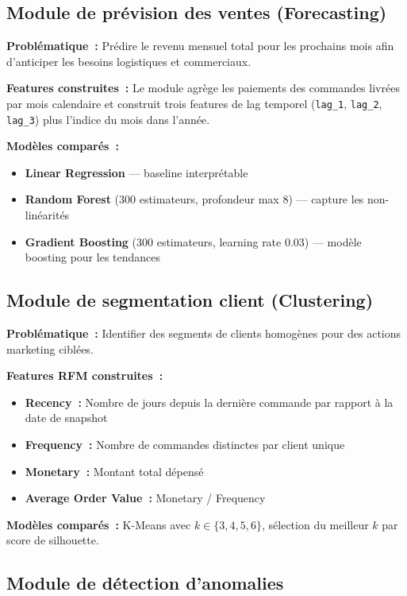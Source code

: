 \subsection{Module de prévision des ventes (Forecasting)}

\textbf{Problématique~:} Prédire le revenu mensuel total pour les prochains mois afin d'anticiper les besoins logistiques et commerciaux.

\textbf{Features construites~:} Le module agrège les paiements des commandes livrées par mois calendaire et construit trois features de lag temporel (\texttt{lag\_1}, \texttt{lag\_2}, \texttt{lag\_3}) plus l'indice du mois dans l'année.

\textbf{Modèles comparés~:}
\begin{itemize}
  \setlength{\itemsep}{0.3em}
  \item \textbf{Linear Regression} — baseline interprétable
  \item \textbf{Random Forest} (300 estimateurs, profondeur max 8) — capture les non-linéarités
  \item \textbf{Gradient Boosting} (300 estimateurs, learning rate 0.03) — modèle boosting pour les tendances
\end{itemize}

\subsection{Module de segmentation client (Clustering)}

\textbf{Problématique~:} Identifier des segments de clients homogènes pour des actions marketing ciblées.

\textbf{Features RFM construites~:}
\begin{itemize}
  \setlength{\itemsep}{0.3em}
  \item \textbf{Recency~:} Nombre de jours depuis la dernière commande par rapport à la date de snapshot
  \item \textbf{Frequency~:} Nombre de commandes distinctes par client unique
  \item \textbf{Monetary~:} Montant total dépensé
  \item \textbf{Average Order Value~:} Monetary / Frequency
\end{itemize}

\textbf{Modèles comparés~:} K-Means avec $k \in \{3, 4, 5, 6\}$, sélection du meilleur $k$ par score de silhouette.

\subsection{Module de détection d'anomalies}


